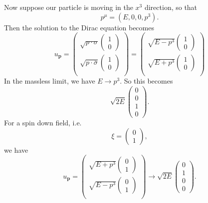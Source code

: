 \documentclass[a4paper]{article}
\begin{document}
Now suppose our particle is moving in the $x^3$ direction, so that
\[
  p^\mu = (E, 0, 0, p^3).
\]
Then the solution to the Dirac equation becomes
\[
  u_\mathbf{p} =
  \begin{pmatrix}
    \sqrt{p\cdot \sigma}
    \begin{pmatrix}
      1\\0
    \end{pmatrix}\\[9pt]
    \sqrt{p\cdot \bar\sigma}
    \begin{pmatrix}
      1\\0
    \end{pmatrix}\\
  \end{pmatrix}
  =
  \begin{pmatrix}
    \sqrt{E - p^3}
    \begin{pmatrix}
      1\\0
    \end{pmatrix}\\[9pt]
    \sqrt{E + p^3}
    \begin{pmatrix}
      1\\0
    \end{pmatrix}\\
  \end{pmatrix}
\]
In the massless limit, we have $E \to p^3$. So this becomes
\[
  \sqrt{2E}
  \begin{pmatrix}
    0\\0\\1\\0
  \end{pmatrix}.
\]
For a spin down field, i.e.
\[
  \xi =
  \begin{pmatrix}
    0\\1
  \end{pmatrix},
\]
we have
\[
  u_\mathbf{p} =
  \begin{pmatrix}
    \sqrt{E + p^3}
    \begin{pmatrix}
      0\\1
    \end{pmatrix}\\[9pt]
    \sqrt{E - p^3}
    \begin{pmatrix}
      0\\1
    \end{pmatrix}\\
  \end{pmatrix}
  \to
  \sqrt{2E}
  \begin{pmatrix}
    0\\1\\0\\0
  \end{pmatrix}.
\]
\end{document}
